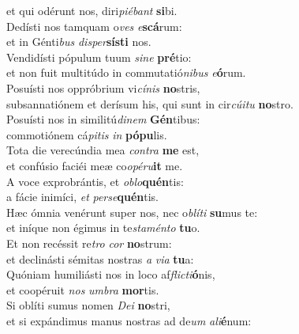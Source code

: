 \evenverse et qui odérunt nos, diri\textit{pi}\textit{é}\textit{bant} \textbf{si}bi.\\
\oddverse Dedísti nos tamquam o\textit{ves} \textit{e}\textbf{scá}rum:~\*\\
\oddverse et in Génti\textit{bus} \textit{di}\textit{sper}\textbf{sí}\textbf{sti} nos.\\
\evenverse Vendidísti pópulum tuum \textit{si}\textit{ne} \textbf{pré}tio:~\*\\
\evenverse et non fuit multitúdo in commutatió\textit{ni}\textit{bus} \textit{e}\textbf{ó}rum.\\
\oddverse Posuísti nos oppróbrium vi\textit{cí}\textit{nis} \textbf{no}stris,~\*\\
\oddverse subsannatiónem et derísum his, qui sunt in cir\textit{cú}\textit{i}\textit{tu} \textbf{no}stro.\\
\evenverse Posuísti nos in similitú\textit{di}\textit{nem} \textbf{Gén}tibus:~\*\\
\evenverse commotiónem cá\textit{pi}\textit{tis} \textit{in} \textbf{pó}\textbf{pu}lis.\\
\oddverse Tota die verecúndia mea \textit{con}\textit{tra} \textbf{me} est,~\*\\
\oddverse et confúsio faciéi meæ co\textit{o}\textit{pé}\textit{ru}\textbf{it} me.\\
\evenverse A voce exprobrántis, et \textit{o}\textit{blo}\textbf{quén}tis:~\*\\
\evenverse a fácie inimíci, \textit{et} \textit{per}\textit{se}\textbf{quén}tis.\\
\oddverse Hæc ómnia venérunt super nos, nec o\textit{blí}\textit{ti} \textbf{su}mus te:~\*\\
\oddverse et iníque non égimus in te\textit{sta}\textit{mén}\textit{to} \textbf{tu}o.\\
\evenverse Et non recéssit re\textit{tro} \textit{cor} \textbf{no}strum:~\*\\
\evenverse et declinásti sémitas nostras \textit{a} \textit{vi}\textit{a} \textbf{tu}a:\\
\oddverse Quóniam humiliásti nos in loco af\textit{fli}\textit{cti}\textbf{ó}nis,~\*\\
\oddverse et coopéruit \textit{nos} \textit{um}\textit{bra} \textbf{mor}tis.\\
\evenverse Si oblíti sumus nomen \textit{De}\textit{i} \textbf{no}stri,~\*\\
\evenverse et si expándimus manus nostras ad de\textit{um} \textit{a}\textit{li}\textbf{é}num:\\
